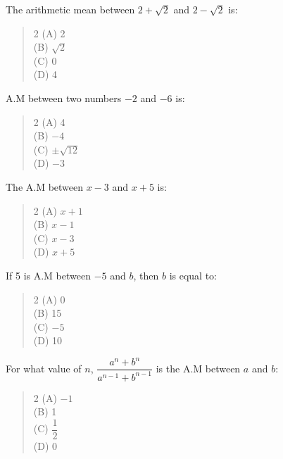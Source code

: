 \documentclass[11pt,a4paper]{article}
\begin{document}
\begin{mcqlist}
\item The arithmetic mean between $2+\sqrt{2}$ and $2-\sqrt{2}$ is:
\begin{quote}\begin{multicols}{2}
\noindent (A) 2 \\
(B) $\sqrt{2}$ \\
(C) 0 \\
(D) 4
\end{multicols}\end{quote}

\item A.M between two numbers $-2$ and $-6$ is:
\begin{quote}\begin{multicols}{2}
\noindent (A) 4 \\
(B) $-4$ \\
(C) $\pm\sqrt{12}$ \\
(D) $-3$
\end{multicols}\end{quote}

\item The A.M between $x-3$ and $x+5$ is:
\begin{quote}\begin{multicols}{2}
\noindent (A) $x+1$ \\
(B) $x-1$ \\
(C) $x-3$ \\
(D) $x+5$
\end{multicols}\end{quote}

\item If 5 is A.M between $-5$ and $b$, then $b$ is equal to:
\begin{quote}\begin{multicols}{2}
\noindent (A) 0 \\
(B) 15 \\
(C) $-5$ \\
(D) 10
\end{multicols}\end{quote}

\item For what value of $n$, $\dfrac{a^n+b^n}{a^{n-1}+b^{n-1}}$ is the A.M between $a$ and $b$:
\begin{quote}\begin{multicols}{2}
\noindent (A) $-1$ \\
(B) 1 \\
(C) $\dfrac{1}{2}$ \\
(D) 0
\end{multicols}\end{quote}


\end{mcqlist}
\end{document}
